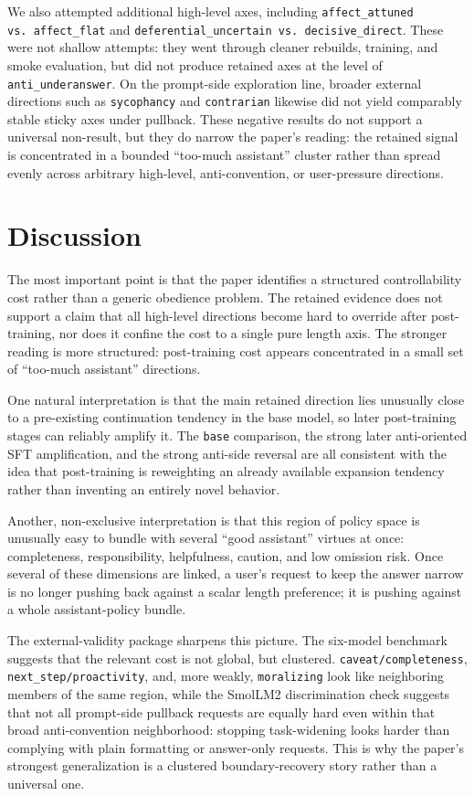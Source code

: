\documentclass[11pt]{article}
\begin{document}
We also attempted additional high-level axes, including \texttt{affect\_attuned vs.\ affect\_flat} and \texttt{deferential\_uncertain vs.\ decisive\_direct}. These were not shallow attempts: they went through cleaner rebuilds, training, and smoke evaluation, but did not produce retained axes at the level of \texttt{anti\_underanswer}. On the prompt-side exploration line, broader external directions such as \texttt{sycophancy} and \texttt{contrarian} likewise did not yield comparably stable sticky axes under pullback. These negative results do not support a universal non-result, but they do narrow the paper's reading: the retained signal is concentrated in a bounded ``too-much assistant'' cluster rather than spread evenly across arbitrary high-level, anti-convention, or user-pressure directions.

\section{Discussion}

The most important point is that the paper identifies a structured controllability cost rather than a generic obedience problem. The retained evidence does not support a claim that all high-level directions become hard to override after post-training, nor does it confine the cost to a single pure length axis. The stronger reading is more structured: post-training cost appears concentrated in a small set of ``too-much assistant'' directions.

One natural interpretation is that the main retained direction lies unusually close to a pre-existing continuation tendency in the base model, so later post-training stages can reliably amplify it. The \texttt{base} comparison, the strong later anti-oriented SFT amplification, and the strong anti-side reversal are all consistent with the idea that post-training is reweighting an already available expansion tendency rather than inventing an entirely novel behavior.

Another, non-exclusive interpretation is that this region of policy space is unusually easy to bundle with several ``good assistant'' virtues at once: completeness, responsibility, helpfulness, caution, and low omission risk. Once several of these dimensions are linked, a user's request to keep the answer narrow is no longer pushing back against a scalar length preference; it is pushing against a whole assistant-policy bundle.

The external-validity package sharpens this picture. The six-model benchmark suggests that the relevant cost is not global, but clustered. \texttt{caveat/completeness}, \texttt{next\_step/proactivity}, and, more weakly, \texttt{moralizing} look like neighboring members of the same region, while the SmolLM2 discrimination check suggests that not all prompt-side pullback requests are equally hard even within that broad anti-convention neighborhood: stopping task-widening looks harder than complying with plain formatting or answer-only requests. This is why the paper's strongest generalization is a clustered boundary-recovery story rather than a universal one.
\end{document}
